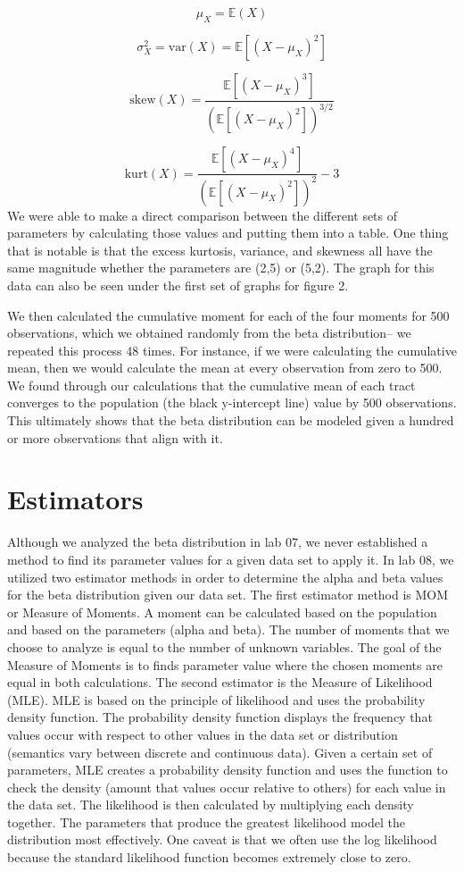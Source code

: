 \documentclass{article}\usepackage[]{graphicx}\usepackage[]{xcolor}
\begin{document}
\begin{multicols}{2}
\[
\mu_X = \mathbb{E}(X)
\]

\[
\sigma_X^2 = \mathrm{var}(X) = \mathbb{E} \left[ (X - \mu_X)^2 \right]
\]

\[
\mathrm{skew}(X) = \frac{\mathbb{E} \left[ (X - \mu_X)^3 \right]}{\left( \mathbb{E} \left[ (X - \mu_X)^2 \right] \right)^{3/2}}
\]

\[
\mathrm{kurt}(X) = \frac{\mathbb{E} \left[ (X - \mu_X)^4 \right]}{\left( \mathbb{E} \left[ (X - \mu_X)^2 \right] \right)^2} - 3
\]
We were able to make a direct comparison between the different sets of parameters by calculating those values and putting them into a table. One thing that is notable is that the excess kurtosis, variance, and skewness all have the same magnitude whether the parameters are (2,5) or (5,2). The graph for this data can also be seen under the first set of graphs for figure 2. 

We then calculated the cumulative moment for each of the four moments for 500 observations, which we obtained randomly from the beta distribution-- we repeated this process 48 times. For instance, if we were calculating the cumulative mean, then we would calculate the mean at every observation from zero to 500. We found through our calculations that the cumulative mean of each tract converges to the population (the black y-intercept line) value by 500 observations. 
This ultimately shows that the beta distribution can be modeled given a hundred or more observations that align with it. 

\section{Estimators}
  Although we analyzed the beta distribution in lab 07, we never established a method to find its parameter values for a given data set to apply it. In lab 08, we utilized two estimator methods in order to determine the alpha and beta values for the beta distribution given our data set. The first estimator method is MOM or Measure of Moments. A moment can be calculated based on the population and based on the parameters (alpha and beta). The number of moments that we choose to analyze is equal to the number of unknown variables. The goal of the Measure of Moments is to finds parameter value where the chosen moments are equal in both calculations. The second estimator is the Measure of Likelihood (MLE). MLE is based on the principle of likelihood and uses the probability density function. The probability density function displays the frequency that values occur with respect to other values in the data set or distribution (semantics vary between discrete and continuous data). Given a certain set of parameters, MLE creates a probability density function and uses the function to check the density (amount that values occur relative to others) for each value in the data set. The likelihood is then calculated by multiplying each density together. The parameters that produce the greatest likelihood model the distribution most effectively. One caveat is that we often use the log likelihood because the standard likelihood function becomes extremely close to zero. 
   

\end{multicols}
\end{document}
